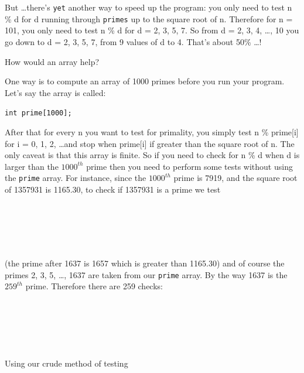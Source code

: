 But \ldots there's \texttt{yet} another way to speed up the program: you only need to test n \% d for d running through \texttt{primes} up to the square root of n. Therefore for n = 101, you only need to test n \% d for d = 2, 3, 5, 7. So from d = 2, 3, 4, \ldots, 10 you go down to d = 2, 3, 5, 7, from 9 values of d to 4. That's about 50\% \ldots !

How would an array help?

One way is to compute an array of 1000 primes before you run your program. Let's say the array is called:

\begin{center}
\texttt{int prime[1000];}
\end{center}

After that for every n you want to test for primality, you simply test n \% prime[i] for i = 0, 1, 2, \ldots and stop when prime[i] if greater than the square root of n. The only caveat is that this array is finite. So if you need to check for n \% d when d is larger than the $1000^{th}$ prime then you need to perform some tests without using the \texttt{prime} array. For instance, since the $1000^{th}$ prime is 7919, and the square root of 1357931 is 1165.30, to check if 1357931 is a prime we test

\\
\\
\\
\tab[3em]{\vdots}\\

(the prime after 1637 is 1657 which is greater than 1165.30) and of course the primes 2, 3, 5, \ldots, 1637 are taken from our \texttt{prime} array. By the way 1637 is the $259^{th}$ prime. Therefore there are 259 checks:

\\
\\
\\
\tab[3em]{\vdots}\\
\\

Using our crude method of testing

\\
\\
\\
\\
\tab[3em]{\vdots}\\
\\

